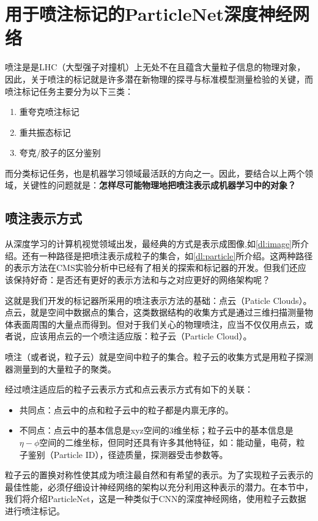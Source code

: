 \chapter{用于喷注标记的ParticleNet深度神经网络}
\label{chap4}
\fontsize{12bp}{14.4pt}

喷注是是LHC（大型强子对撞机）上无处不在且蕴含大量粒子信息的物理对象，因此，关于喷注的标记就是许多潜在新物理的探寻与标准模型测量检验的关键，而喷注标记任务主要分为以下三类：
\begin{enumerate}
    \item 重夸克喷注标记
    \item 重共振态标记
    \item 夸克/胶子的区分鉴别
\end{enumerate}

而分类标记任务，也是机器学习领域最活跃的方向之一。因此，要结合以上两个领域，关键性的问题就是：\textbf{怎样尽可能物理地把喷注表示成机器学习中的对象？}
\section{喷注表示方式}
从深度学习的计算机视觉领域出发，最经典的方式是表示成图像,如\ref{dl:image}所介绍。还有一种路径是把喷注表示成粒子的集合，如\ref{dl:particle}所介绍。这两种路径的表示方法在CMS实验分析中已经有了相关的探索和标记器的开发。但我们还应该保持好奇：是否还有更好的表示方法和与之对应更好的网络架构呢？

这就是我们开发的标记器所采用的喷注表示方法的基础：点云（Paticle Clouds）。点云，就是空间中数据点的集合，这类数据结构的收集方式是通过三维扫描测量物体表面周围的大量点而得到。但对于我们关心的物理喷注，应当不仅仅用点云，或者说，应该用点云的一个喷注适应版：粒子云\cite{PaticleNet}（Particle Cloud）。

喷注（或者说，粒子云）就是空间中粒子的集合。粒子云的收集方式是用粒子探测器测量到的大量粒子的聚类。

经过喷注适应后的粒子云表示方式和点云表示方式有如下的关联：
\begin{itemize}
    \item 共同点：点云中的点和粒子云中的粒子都是内禀无序的。
    \item 不同点：点云中的基本信息是xyz空间的3维坐标；粒子云中的基本信息是$\eta-\phi$空间的二维坐标，但同时还具有许多其他特征，如：能动量，电荷，粒子鉴别（Particle ID），径迹质量，探测器受击参数等。
\end{itemize}
粒子云的置换对称性使其成为喷注最自然和有希望的表示。为了实现粒子云表示的最佳性能，必须仔细设计神经网络的架构以充分利用这种表示的潜力。在本节中，我们将介绍ParticleNet，这是一种类似于CNN的深度神经网络，使用粒子云数据进行喷注标记。
